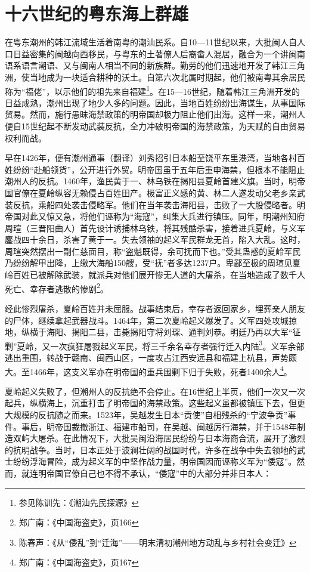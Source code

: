 \section{十六世纪的粤东海上群雄}

\indent 在粤东潮州的韩江流域生活着南粤的潮汕民系。自10—11世纪以来，大批闽人自人口日益密集的闽越向西移民，与粤东的土著僚人后裔畲人混居，融合为一个讲闽南语系语言潮语、又与闽南人相当不同的新族群。勤劳的他们迅速地开发了韩江三角洲，使当地成为一块适合耕种的沃土。自第六次北属时期起，他们被南粤其余居民称为“福佬”，以示他们的祖先来自福建\footnote{参见陈训先：《潮汕先民探源》}。在15—16世纪，随着韩江三角洲开发的日益成熟，潮州出现了地少人多的问题。因此，当地百姓纷纷出海谋生，从事国际贸易。然而，施行愚昧海禁政策的明帝国却极力阻止他们出海。这样一来，潮州人便自15世纪起不断发动武装反抗，全力冲破明帝国的海禁政策，为天赋的自由贸易权利而战。

早在1426年，便有潮州通事（翻译）刘秀招引日本船至饶平东里港湾，当地各村百姓纷纷“赴船领货”，公开进行外贸。明帝国虽于五年后重申海禁，但根本不能阻止潮州人的反抗。1460年，渔民黄于一、林乌铁在揭阳县夏岭首建义旗。当时，明帝国官僚在夏岭纵容无赖侵占百姓田产。极富正义感的黄、林二人遂发动父老乡亲武装反抗，乘船四处袭击侵略军。他们在当年袭击海阳县，击败了一大股侵略者。明帝国对此又惊又急，将他们诬称为“海寇”，纠集大兵进行镇压。同年，明潮州知府周瑄（三晋阳曲人）首先设计诱捕林乌铁，将其残酷杀害，接着进兵夏岭，与义军鏖战四十余日，杀害了黄于一。失去领袖的起义军民群龙无首，陷入大乱。这时，周瑄突然摆出一副仁慈面目，称“盗魁既得，余可抚而下也。”受其蛊惑的夏岭军民乃纷纷解甲出降，上缴大海船150艘，受“抚”者多达1237户。卑鄙至极的周瑄见夏岭百姓已被解除武装，就派兵对他们展开惨无人道的大屠杀，在当地造成了数千人死亡、幸存者逃散的惨剧\footnote{郑广南：《中国海盗史》，页166}。

经此惨烈屠杀，夏岭百姓并未屈服。战事结束后，幸存者返回家乡，埋葬亲人朋友的尸体，继续拿起武器战斗。1464年，第二次夏岭起义爆发了。义军四处攻城掠地，纵横于海阳、揭阳二县，击毙揭阳守将刘琛、通判刘恭。明廷乃再以大军“征剿”夏岭，又一次疯狂屠戮起义军民，将三千余名幸存者强行迁入内陆\footnote{陈春声：《从“倭乱”到“迁海”——明末清初潮州地方动乱与乡村社会变迁》}。义军余部逃出重围，转战于赣南、闽西山区，一度攻占江西安远县和福建上杭县，声势颇大。至1466年，这支义军亦在明帝国的重兵围剿下归于失败，死者1400余人\footnote{郑广南：《中国海盗史》，页167}。

夏岭起义失败了，但潮州人的反抗绝不会停止。在16世纪上半页，他们一次又一次起兵，纵横海上，沉重打击了明帝国的海禁政策。这些起义虽都被镇压下去，但更大规模的反抗随之而来。1523年，吴越发生日本“贡使”自相残杀的“宁波争贡”事件。事后，明帝国裁撤浙江、福建市舶司，在吴越、闽越厉行海禁，并于1548年制造双屿大屠杀。在此情况下，大批吴闽沿海居民纷纷与日本海商合流，展开了激烈的抗明战争。当时，日本正处于波澜壮阔的战国时代，许多在战争中失去领地的武士纷纷浮海冒险，成为起义军的中坚作战力量，明帝国因而诬称义军为“倭寇”。然而，就连明帝国官僚自己也不得不承认，“倭寇”中的大部分并非日本人：

